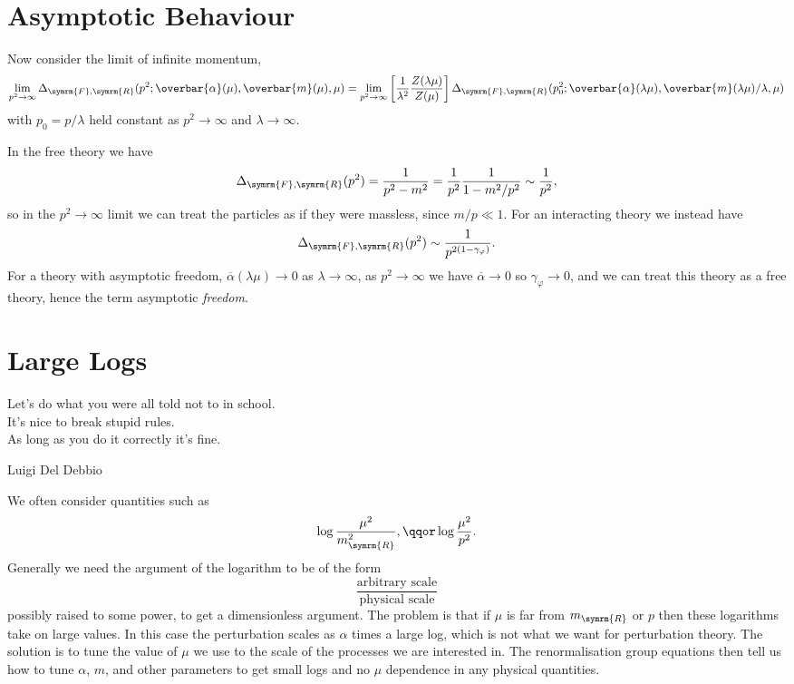 \documentclass[fleqn]{NotesClass}
\newcommand{\feynman}{\symrm{F}}
\newcommand{\renormalised}{\symrm{R}}
\begin{document}
    \section{Asymptotic Behaviour}
    Now consider the limit of infinite momentum,
    \begin{equation*}
        \lim_{p^2 \to \infty} \Delta_{\feynman,\renormalised}(p^2; \overbar{\alpha}(\mu), \overbar{m}(\mu), \mu) = \lim_{p^2 \to  \infty} \left[ \frac{1}{\lambda^2} \frac{Z(\lambda\mu)}{Z(\mu)} \right] \Delta_{\feynman,\renormalised}(p_0^2; \overbar{\alpha}(\lambda\mu), \overbar{m}(\lambda\mu)/\lambda, \mu)
    \end{equation*}
    with \(p_0 = p/\lambda\) held constant as \(p^2 \to \infty\) and \(\lambda \to \infty\).
    
    In the free theory we have
    \begin{equation}
        \Delta_{\feynman,\renormalised}(p^2) = \frac{1}{p^2 - m^2} = \frac{1}{p^2} \frac{1}{1 - m^2/p^2} \sim \frac{1}{p^2},
    \end{equation}
    so in the \(p^2 \to \infty\) limit we can treat the particles as if they were massless, since \(m/p \ll 1\).
    For an interacting theory we instead have
    \begin{equation}
        \Delta_{\feynman,\renormalised}(p^2) \sim \frac{1}{p^{2(1 - \gamma_\varphi)}}.
    \end{equation}
    For a theory with asymptotic freedom, \(\overbar{\alpha}(\lambda\mu) \to 0\) as \(\lambda \to \infty\), as \(p^2 \to \infty\) we have \(\overbar{\alpha} \to 0\) so \(\gamma_\varphi \to 0\), and we can treat this theory as a free theory, hence the term asymptotic \emph{freedom}.
    
    \section{Large Logs}
    \epigraph{Let's do what you were all told not to in school.\\ It's nice to break stupid rules.\\ As long as you do it correctly it's fine.}{Luigi Del Debbio}
    We often consider quantities such as
    \begin{equation}
        \log \frac{\mu^2}{m_{\renormalised}^2}, \qqor \log \frac{\mu^2}{p^2}.
    \end{equation}
    Generally we need the argument of the logarithm to be of the form 
    \begin{equation}
        \frac{\text{arbitrary scale}}{\text{physical scale}}
    \end{equation}
    possibly raised to some power, to get a dimensionless argument.
    The problem is that if \(\mu\) is far from \(m_{\renormalised}\) or \(p\) then these logarithms take on large values.
    In this case the perturbation scales as \(\alpha\) times a large log, which is not what we want for perturbation theory.
    The solution is to tune the value of \(\mu\) we use to the scale of the processes we are interested in.
    The renormalisation group equations then tell us how to tune \(\alpha\), \(m\), and other parameters to get small logs and no \(\mu\) dependence in any physical quantities.
    
\end{document}
